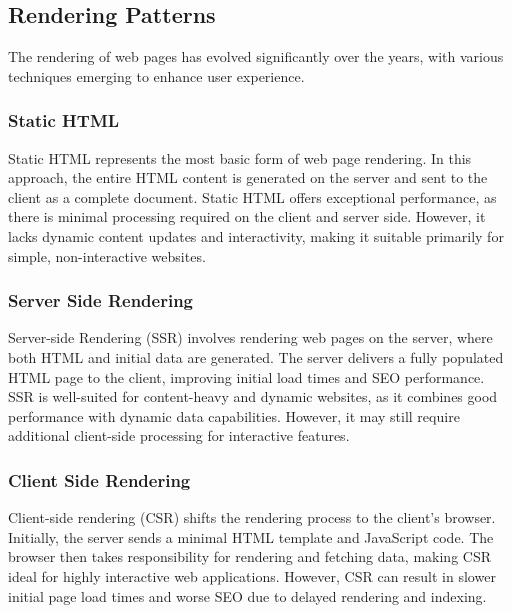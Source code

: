 \subsection{Rendering Patterns}
\label{sec:rendering-patterns}


The rendering of web pages has evolved significantly over the years, with various techniques emerging to enhance user experience. 

\subsubsection{Static HTML}
Static HTML represents the most basic form of web page rendering. In this approach, the entire HTML content is generated on the server and sent to the client as a complete document. Static HTML offers exceptional performance, as there is minimal processing required on the client and server side. However, it lacks dynamic content updates and interactivity, making it suitable primarily for simple, non-interactive websites.

\subsubsection{Server Side Rendering}
Server-side Rendering (SSR) involves rendering web pages on the server, where both HTML and initial data are generated. The server delivers a fully populated HTML page to the client, improving initial load times and SEO performance. SSR is well-suited for content-heavy and dynamic websites, as it combines good performance with dynamic data capabilities. However, it may still require additional client-side processing for interactive features.

\subsubsection{Client Side Rendering}
Client-side rendering (CSR) shifts the rendering process to the client's browser. Initially, the server sends a minimal HTML template and JavaScript code. The browser then takes responsibility for rendering and fetching data, making CSR ideal for highly interactive web applications. However, CSR can result in slower initial page load times and worse SEO due to delayed rendering and indexing.

